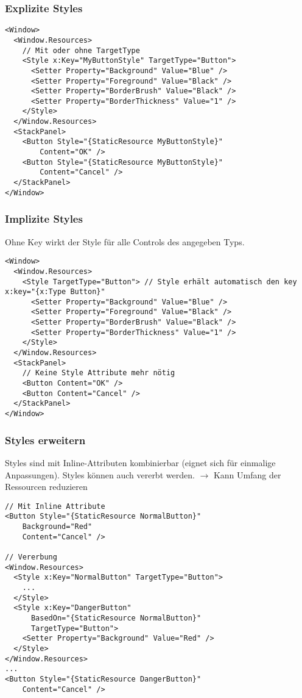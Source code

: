 \subsubsection{Explizite Styles}
\begin{lstlisting}
<Window>
  <Window.Resources>
    // Mit oder ohne TargetType
    <Style x:Key="MyButtonStyle" TargetType="Button">
      <Setter Property="Background" Value="Blue" />
      <Setter Property="Foreground" Value="Black" />
      <Setter Property="BorderBrush" Value="Black" />
      <Setter Property="BorderThickness" Value="1" />
    </Style>
  </Window.Resources>
  <StackPanel>
    <Button Style="{StaticResource MyButtonStyle}"
        Content="OK" />
    <Button Style="{StaticResource MyButtonStyle}"
        Content="Cancel" />
  </StackPanel>
</Window>
\end{lstlisting}
\subsubsection{Implizite Styles}
Ohne Key wirkt der Style für alle Controls des angegeben Typs.
\begin{lstlisting}
<Window>
  <Window.Resources>
    <Style TargetType="Button"> // Style erhält automatisch den key x:key="{x:Type Button}"
      <Setter Property="Background" Value="Blue" />
      <Setter Property="Foreground" Value="Black" />
      <Setter Property="BorderBrush" Value="Black" />
      <Setter Property="BorderThickness" Value="1" />
    </Style>
  </Window.Resources>
  <StackPanel>
    // Keine Style Attribute mehr nötig
    <Button Content="OK" />
    <Button Content="Cancel" />
  </StackPanel>
</Window>
\end{lstlisting}
\subsubsection{Styles erweitern}
Styles sind mit Inline-Attributen kombinierbar (eignet sich für einmalige Anpassungen). Styles können auch vererbt werden. $\rightarrow$ Kann Umfang der Ressourcen reduzieren
\begin{lstlisting}
// Mit Inline Attribute
<Button Style="{StaticResource NormalButton}"
    Background="Red"
    Content="Cancel" />

// Vererbung
<Window.Resources>
  <Style x:Key="NormalButton" TargetType="Button">
    ...
  </Style>
  <Style x:Key="DangerButton"
      BasedOn="{StaticResource NormalButton}"
      TargetType="Button">
    <Setter Property="Background" Value="Red" />
  </Style>
</Window.Resources>
...
<Button Style="{StaticResource DangerButton}"
    Content="Cancel" />
\end{lstlisting}
